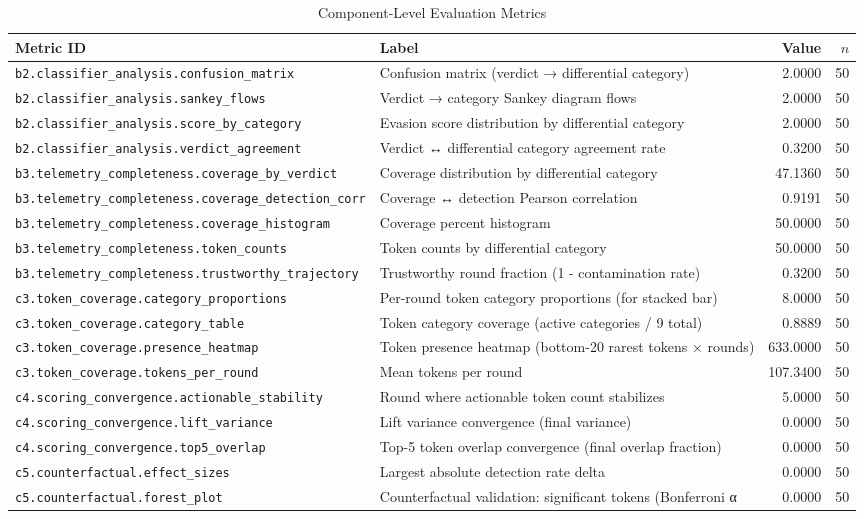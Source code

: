 \begin{table}[htbp]
\centering
\caption{Component-Level Evaluation Metrics}
\label{tab:component-metrics}
\begin{tabular}{llrr}
\toprule
Metric ID & Label & Value & $n$ \\
\midrule
\texttt{b2.classifier\_analysis.confusion\_matrix} & Confusion matrix (verdict → differential category) & 2.0000 & 50 \\
\texttt{b2.classifier\_analysis.sankey\_flows} & Verdict → category Sankey diagram flows & 2.0000 & 50 \\
\texttt{b2.classifier\_analysis.score\_by\_category} & Evasion score distribution by differential category & 2.0000 & 50 \\
\texttt{b2.classifier\_analysis.verdict\_agreement} & Verdict ↔ differential category agreement rate & 0.3200 & 50 \\
\midrule
\texttt{b3.telemetry\_completeness.coverage\_by\_verdict} & Coverage distribution by differential category & 47.1360 & 50 \\
\texttt{b3.telemetry\_completeness.coverage\_detection\_corr} & Coverage ↔ detection Pearson correlation & 0.9191 & 50 \\
\texttt{b3.telemetry\_completeness.coverage\_histogram} & Coverage percent histogram & 50.0000 & 50 \\
\texttt{b3.telemetry\_completeness.token\_counts} & Token counts by differential category & 50.0000 & 50 \\
\texttt{b3.telemetry\_completeness.trustworthy\_trajectory} & Trustworthy round fraction (1 - contamination rate) & 0.3200 & 50 \\
\midrule
\texttt{c3.token\_coverage.category\_proportions} & Per-round token category proportions (for stacked bar) & 8.0000 & 50 \\
\texttt{c3.token\_coverage.category\_table} & Token category coverage (active categories / 9 total) & 0.8889 & 50 \\
\texttt{c3.token\_coverage.presence\_heatmap} & Token presence heatmap (bottom-20 rarest tokens × rounds) & 633.0000 & 50 \\
\texttt{c3.token\_coverage.tokens\_per\_round} & Mean tokens per round & 107.3400 & 50 \\
\midrule
\texttt{c4.scoring\_convergence.actionable\_stability} & Round where actionable token count stabilizes & 5.0000 & 50 \\
\texttt{c4.scoring\_convergence.lift\_variance} & Lift variance convergence (final variance) & 0.0000 & 50 \\
\texttt{c4.scoring\_convergence.top5\_overlap} & Top-5 token overlap convergence (final overlap fraction) & 0.0000 & 50 \\
\midrule
\texttt{c5.counterfactual.effect\_sizes} & Largest absolute detection rate delta & 0.0000 & 50 \\
\texttt{c5.counterfactual.forest\_plot} & Counterfactual validation: significant tokens (Bonferroni α & 0.0000 & 50 \\
\bottomrule
\end{tabular}
\end{table}
